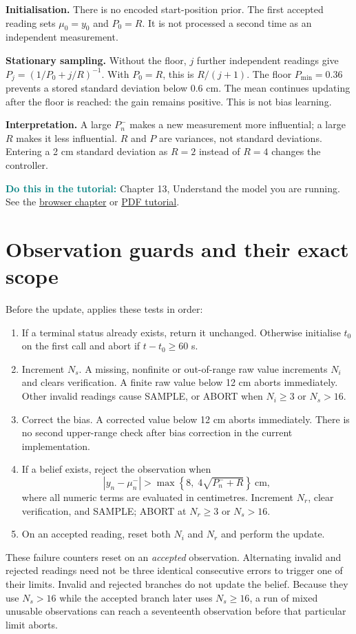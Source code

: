 \documentclass[11pt,a4paper]{article}
\newcommand{\code}[1]{\texttt{\detokenize{#1}}}
\newcommand{\tuto}[2]{\par\textcolor{teal}{\textbf{Do this in the tutorial:}} Chapter #1, #2. See the \href{Tutorial_A_to_Z.html\#t#1}{browser chapter} or \href{Tutorial_A_to_Z.pdf}{PDF tutorial}.\par}
\begin{document}
\textbf{Initialisation.} There is no encoded start-position prior. The first accepted reading sets $\mu_0=y_0$ and $P_0=R$. It is not processed a second time as an independent measurement.

\textbf{Stationary sampling.} Without the floor, $j$ further independent readings give $P_j=(1/P_0+j/R)^{-1}$. With $P_0=R$, this is $R/(j+1)$. The floor $P_{\min}=0.36$ prevents a stored standard deviation below $0.6$ cm. The mean continues updating after the floor is reached: the gain remains positive. This is not bias learning.

\textbf{Interpretation.} A large $P_n^-$ makes a new measurement more influential; a large $R$ makes it less influential. $R$ and $P$ are variances, not standard deviations. Entering a 2 cm standard deviation as $R=2$ instead of $R=4$ changes the controller.
\tuto{13}{Understand the model you are running}

\section{Observation guards and their exact scope}
Before the update, \code{Controller.observe} applies these tests in order:
\begin{enumerate}
\item If a terminal status already exists, return it unchanged. Otherwise initialise $t_0$ on the first call and abort if $t-t_0\geq60$ s.
\item Increment $N_s$. A missing, nonfinite or out-of-range raw value increments $N_i$ and clears verification. A finite raw value below 12 cm aborts immediately. Other invalid readings cause SAMPLE, or ABORT when $N_i\geq3$ or $N_s>16$.
\item Correct the bias. A corrected value below 12 cm aborts immediately. There is no second upper-range check after bias correction in the current implementation.
\item If a belief exists, reject the observation when
\begin{equation}
 |y_n-\mu_n^-|>\max\left\{8,\;4\sqrt{P_n^-+R}\right\}\ \mathrm{cm},
\end{equation}
where all numeric terms are evaluated in centimetres. Increment $N_r$, clear verification, and SAMPLE; ABORT at $N_r\geq3$ or $N_s>16$.
\item On an accepted reading, reset both $N_i$ and $N_r$ and perform the update.
\end{enumerate}
These failure counters reset on an \emph{accepted} observation. Alternating invalid and rejected readings need not be three identical consecutive errors to trigger one of their limits. Invalid and rejected branches do not update the belief. Because they use $N_s>16$ while the accepted branch later uses $N_s\geq16$, a run of mixed unusable observations can reach a seventeenth observation before that particular limit aborts.
\end{document}
